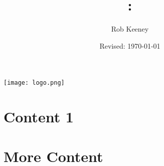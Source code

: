 \documentclass[addpoints,12pt,answers]{exam} %
\title{\theSchool : \docTitle}
\author{Rob Keeney}
\date{Revised: \today}
\newcommand{\MainPath}{C:/Main\space Document\space Path/}
\newcommand{\ResourcePath}{\MainPath Resources/}
\begin{document}

    \makeatletter
    \makeatother

    \pointsinrightmargin
    \maketitle
    \begin{center} %
        \texttt{[image: logo.png]}
    \end{center}
    \clearpage
    \tableofcontents
    \clearpage


    \section[Handout 1]{Content 1}
    \label{sec:content1}

    \section[Handout 2]{More Content}
    \label{sec:content2}

\end{document}
